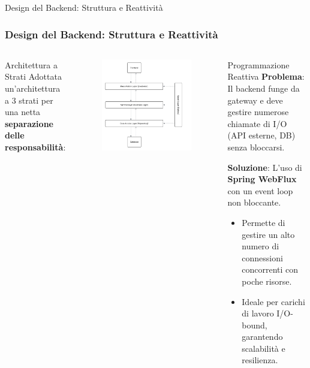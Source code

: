 \documentclass[8pt]{beamer}
\begin{document}
\begin{frame}{Design del Backend: Struttura e Reattività}
  \frametitle{Design del Backend: Struttura e Reattività}
  \begin{columns}[T]
    \begin{block}{Architettura a Strati}
      Adottata un'architettura a 3 strati per una netta \textbf{separazione delle responsabilità}:

    \end{block}
    \begin{figure}
      \includegraphics[width=\textwidth]{figures/layer_design.pdf}
    \end{figure}

    \begin{alertblock}{Programmazione Reattiva}
      \textbf{Problema}: Il backend funge da gateway e deve gestire numerose chiamate di I/O (API esterne, DB) senza bloccarsi.
      \vspace{0.5cm}

      \textbf{Soluzione}: L'uso di \textbf{Spring WebFlux} con un event loop non bloccante.
      \begin{itemize}
        \item Permette di gestire un alto numero di connessioni concorrenti con poche risorse.
        \item Ideale per carichi di lavoro I/O-bound, garantendo scalabilità e resilienza.
      \end{itemize}
    \end{alertblock}
  \end{columns}
\end{frame}
\end{document}
